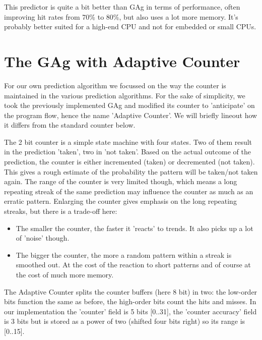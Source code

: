 \documentclass[a4paper]{article}
\begin{document}
This predictor is quite a bit better than GAg in terms of performance, often improving hit rates
from 70\% to 80\%, but also uses a lot more memory. It's probably better suited for a high-end CPU and
not for embedded or small CPUs.


\section{The GAg with Adaptive Counter%
  \label{the-gag-with-adaptive-counter}%
}

For our own prediction algorithm we focussed on the way the counter is maintained
in the various prediction algorithms. For the sake of simplicity, we took the
previously implemented GAg and modified its counter to 'anticipate' on the program
flow, hence the name 'Adaptive Counter'. We will briefly lineout how it differs
from the standard counter below.

The 2 bit counter is a simple state machine with four states. Two of them result in
the prediction 'taken', two in 'not taken'. Based on the actual outcome of the
prediction, the counter is either incremented (taken) or decremented (not taken).
This gives a rough estimate of the probability the pattern will be taken/not taken
again. The range of the counter is very limited though, which means a long repeating
streak of the same prediction may influence the counter as much as an erratic pattern.
Enlarging the counter gives emphasis on the long repeating streaks, but there is a
trade-off here:
%
\begin{itemize}

\item The smaller the counter, the faster it 'reacts' to trends. It also picks up a lot of 'noise' though.

\item The bigger the counter, the more a random pattern within a streak is smoothed out. At the cost of the reaction to short patterns and of course at the cost of much more memory.

\end{itemize}

The Adaptive Counter splits the counter buffers (here 8 bit) in two: the low-order bits
function the same as before, the high-order bits count the hits and misses.
In our implementation the 'counter' field is 5 bits {[}0..31{]}, the 'counter accuracy' field
is 3 bits but is stored as a power of two (shifted four bits right) so its range
is {[}0..15{]}.
\end{document}
